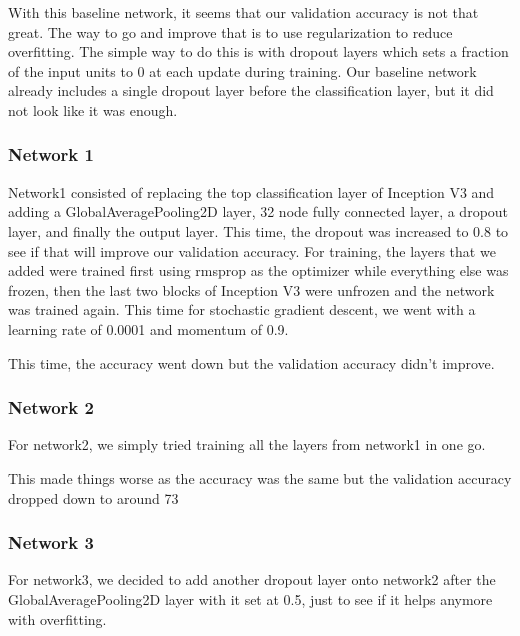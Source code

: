 
With this baseline network, it seems that our validation accuracy is not that great. The way to go and improve that is to use regularization to reduce overfitting. The simple way to do this is with dropout layers which sets a fraction of the input units to 0 at each update during training. Our baseline network already includes a single dropout layer before the classification layer, but it did not look like it was enough.
\subsubsection{Network 1}

Network1 consisted of replacing the top classification layer of Inception V3 and adding a GlobalAveragePooling2D layer, 32 node fully connected layer, a dropout layer, and finally the output layer. This time, the dropout was increased to 0.8 to see if that will improve our validation accuracy. For training, the layers that we added were trained first using rmsprop as the optimizer while everything else was frozen, then the last two blocks of Inception V3 were unfrozen and the network was trained again. This time for stochastic gradient descent, we went with a learning rate of 0.0001 and momentum of 0.9.


This time, the accuracy went down but the validation accuracy didn’t improve.
\subsubsection{Network 2}

For network2, we simply tried training all the layers from network1 in one go.


This made things worse as the accuracy was the same but the validation accuracy dropped down to around 73%
\subsubsection{Network 3}

For network3, we decided to add another dropout layer onto network2 after the GlobalAveragePooling2D layer with it set at 0.5, just to see if it helps anymore with overfitting. 


